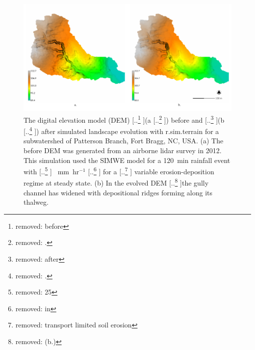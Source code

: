 \documentclass[gmd, manuscript]{copernicus}
\providecommand{\DIFadd}[1]{{\protect\color{blue} \sf #1}} %
\providecommand{\DIFdel}[1]{{\protect\color{red} [..\footnote{removed: #1} ]}} %
\providecommand{\DIFaddFL}[1]{\DIFadd{#1}} %
\providecommand{\DIFdelFL}[1]{\DIFdel{#1}} %
\providecommand{\DIFaddbeginFL}{} %
\providecommand{\DIFaddendFL}{} %
\providecommand{\DIFdelbeginFL}{} %
\providecommand{\DIFdelendFL}{} %
\begin{document}


\begin{figure}%
\center
\includegraphics[width=\textwidth,height=0.925\textheight,keepaspectratio]{figures/evolution.pdf}
\caption{
The digital elevation model (DEM) 
\DIFdelbeginFL \DIFdelFL{before }\DIFdelendFL (a\DIFdelbeginFL \DIFdelFL{.}\DIFdelendFL ) \DIFaddbeginFL \DIFaddFL{before }\DIFaddendFL and \DIFdelbeginFL \DIFdelFL{after }\DIFdelendFL (b\DIFdelbeginFL \DIFdelFL{.}\DIFdelendFL ) \DIFaddbeginFL \DIFaddFL{after
}\DIFaddendFL simulated landscape evolution with r.sim.terrain 
\DIFaddbeginFL \DIFaddFL{for a subwatershed of Patterson Branch, Fort Bragg, NC, USA}\DIFaddendFL . 
\DIFaddbeginFL \DIFaddFL{(a) The before DEM was generated from an airborne lidar survey in 2012. 
}\DIFaddendFL This simulation used the SIMWE model
for a 120~\unit{min} rainfall event with \DIFdelbeginFL \DIFdelFL{25}\DIFdelendFL \DIFaddbeginFL \DIFaddFL{50}\DIFaddendFL ~\unit{mm~hr}$^{-1}$
\DIFdelbeginFL \DIFdelFL{in }\DIFdelendFL \DIFaddbeginFL \DIFaddFL{for }\DIFaddendFL a \DIFdelbeginFL \DIFdelFL{transport limited soil erosion }\DIFdelendFL \DIFaddbeginFL \DIFaddFL{variable erosion-deposition }\DIFaddendFL regime at steady state.
\DIFaddbeginFL \DIFaddFL{(b) }\DIFaddendFL In the evolved DEM 
\DIFdelbeginFL \DIFdelFL{(b.)
}\DIFdelendFL the gully channel has widened 
with depositional ridges forming along its thalweg.}
\label{fig:evolution}
\end{figure}

\end{document}
